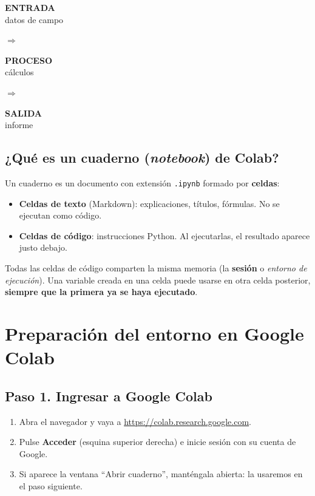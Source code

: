 \documentclass[11pt,a4paper]{article}
\newcommand{\code}[1]{\texttt{#1}}
\newcommand{\menu}[1]{\textbf{\color{moradoOsc}#1}}
\begin{document}
\begin{center}
\begin{tcolorbox}[colback=tealClaro!35,colframe=tealProfundo,width=0.31\textwidth,box align=center,nobeforeafter,halign=center,arc=2pt]
\textbf{ENTRADA}\\[-2pt]{\small datos de campo}
\end{tcolorbox}
\enspace$\Longrightarrow$\enspace
\begin{tcolorbox}[colback=moradoClaro!45,colframe=morado,width=0.25\textwidth,box align=center,nobeforeafter,halign=center,arc=2pt]
\textbf{PROCESO}\\[-2pt]{\small cálculos}
\end{tcolorbox}
\enspace$\Longrightarrow$\enspace
\begin{tcolorbox}[colback=acentoClaro!70,colframe=acento,width=0.25\textwidth,box align=center,nobeforeafter,halign=center,arc=2pt]
\textbf{SALIDA}\\[-2pt]{\small informe}
\end{tcolorbox}
\end{center}

\subsection{¿Qué es un cuaderno (\emph{notebook}) de Colab?}
Un cuaderno es un documento con extensión \code{.ipynb} formado por \textbf{celdas}:
\begin{itemize}
  \item \textbf{Celdas de texto} (Markdown): explicaciones, títulos, fórmulas. No se ejecutan como código.
  \item \textbf{Celdas de código}: instrucciones Python. Al ejecutarlas, el resultado aparece justo debajo.
\end{itemize}
Todas las celdas de código comparten la misma memoria (la \textbf{sesión} o \emph{entorno de ejecución}). Una variable creada en una celda puede usarse en otra celda posterior, \textbf{siempre que la primera ya se haya ejecutado}.

\section{Preparación del entorno en Google Colab}

\subsection{Paso 1. Ingresar a Google Colab}
\begin{enumerate}
  \item Abra el navegador y vaya a \url{https://colab.research.google.com}.
  \item Pulse \menu{Acceder} (esquina superior derecha) e inicie sesión con su cuenta de Google.
  \item Si aparece la ventana ``Abrir cuaderno'', manténgala abierta: la usaremos en el paso siguiente.
\end{enumerate}
\end{document}
